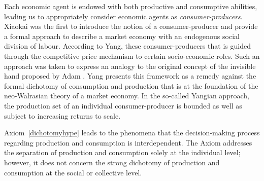 Each economic agent is endowed with both productive and consumptive abilities, leading us to appropriately consider economic agents as \emph{consumer-producers}. Xiaokai \citet{Yang1988, Yang2001} was the first to introduce the notion of a consumer-producer and provide a formal approach to describe a market economy with an endogenous social division of labour. According to Yang, these consumer-producers that is guided through the competitive price mechanism to certain socio-economic roles. Such an approach was taken to express an analogy to the original concept of the invisible hand proposed by Adam \citet{Smith1776}. Yang presents this framework as a remedy against the formal dichotomy of consumption and production that is at the foundation of the neo-Walrasian theory of a market economy. In the so-called Yangian approach, the production set of an individual consumer-producer is bounded as well as subject to increasing returns to scale.



Axiom~\ref{dichotomyhype} leads to the phenomena that the decision-making process regarding production and consumption is interdependent. The Axiom addresses the separation of production and consumption solely at the individual level; however, it does not concern the strong dichotomy of production and consumption at the social or collective level.

